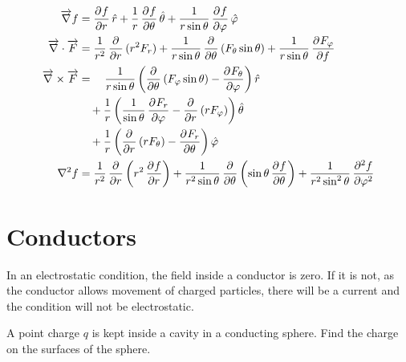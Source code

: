 \documentclass[fleqn, a4paper, 12pt, twoside]{article}
\theoremstyle{definition}
\theoremstyle{theorem}
\begin{document}
\begin{align*}
	\overrightarrow{\nabla} f &= \dpd{f}{r} \hat{r} + \dfrac{1}{r} \dpd{f}{\theta} \hat{\theta} + \dfrac{1}{r \sin \theta} \dpd{f}{\varphi} \hat{\varphi}\\
	\overrightarrow{\nabla} \cdot \overrightarrow{F} &= \dfrac{1}{r^2} \dpd{}{r} (r^2 F_r) + \dfrac{1}{r \sin \theta} \dpd{}{\theta} (F_{\theta} \sin \theta) + \dfrac{1}{r \sin \theta} \dpd{F_{\varphi}}{f}\\
	\overrightarrow{\nabla} \times \overrightarrow{F} &= \quad \dfrac{1}{r \sin \theta} \left( \dpd{}{\theta} (F_{\varphi} \sin \theta) - \dpd{F_{\theta}}{\varphi} \right) \hat{r}\\
	&\quad + \dfrac{1}{r} \left( \dfrac{1}{\sin \theta} \dpd{F_r}{\varphi} - \dpd{}{r} (r F_{\varphi}) \right) \hat{\theta}\\
	&\quad + \dfrac{1}{r} \left( \dpd{}{r} (r F_{\theta}) - \dpd{F_r}{\theta} \right) \hat{\varphi}\\
	\nabla^2 f &= \dfrac{1}{r^2} \dpd{}{r} \left( r^2 \dpd{f}{r} \right) + \dfrac{1}{r^2 \sin \theta} \dpd{}{\theta} \left( \sin \theta \dpd{f}{\theta} \right) + \dfrac{1}{r^2 \sin^2 \theta} \dpd[2]{f}{\varphi}
\end{align*}

\section{Conductors}

In an electrostatic condition, the field inside a conductor is zero.
If it is not, as the conductor allows movement of charged particles, there will be a current and the condition will not be electrostatic.

\begin{question}
	A point charge $q$ is kept inside a cavity in a conducting sphere.
	Find the charge on the surfaces of the sphere.
	\begin{figure}[H]
	\end{figure}
\end{question}
\end{document}
